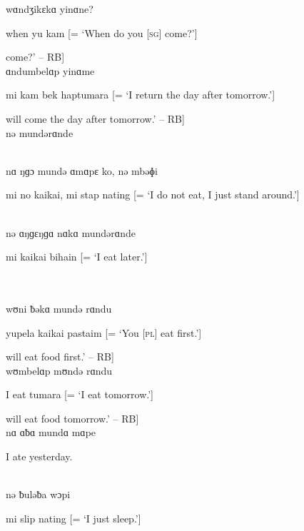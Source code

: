 \noindent wɑndʒikɛkɑ yinɑne?

\noindent when yu kam [= ‘When do you [\textsc{sg}] come?’]

\noindent [‘When will you [\textsc{sg}] come?’ -- RB]\\

\noindent ɑndumbelɑp yinɑme

\noindent mi kam bek haptumara [= ‘I return the day after tomorrow.’]

\noindent [‘[I] will come the day after tomorrow.’ -- RB]\\

\noindent nə mundərɑnde


\\

\noindent nɑ ŋɡɔ mundə ɑmɑpɛ ko, nə mbəɸi

\noindent mi no kaikai, mi stap nating [= ‘I do not eat, I just stand around.’]

\\

\noindent nə ɑŋɡɛŋɡɑ nɑkɑ mundərɑnde

\noindent mi kaikai bihain [= ‘I eat later.’]

\\

\\

\noindent wʊni ƀəkɑ mundə rɑndu

\noindent yupela kaikai pastaim [= ‘You [\textsc{pl}] eat first.’]

\noindent [‘You [\textsc{pl}] will eat food first.’ -- RB]\\

\noindent wʊmbelɑp mʊndə rɑndu

\noindent I eat tumara [= ‘I eat tomorrow.’]

\noindent [‘[I] will eat food tomorrow.’ -- RB]\\

\noindent nɑ ɑƀɑ mundɑ mɑpe

\noindent I ate yesterday.

\\

\noindent nə ƀuləƀa wɔpi

\noindent mi slip nating [= ‘I just sleep.’]


